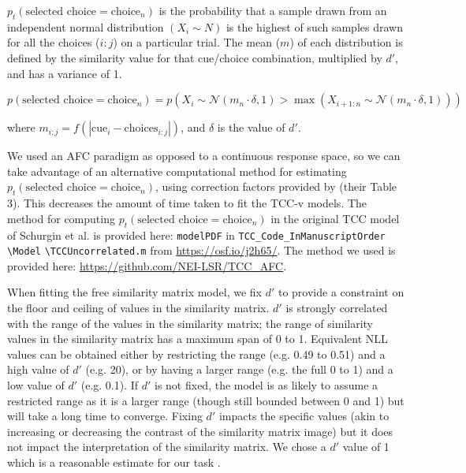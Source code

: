 \documentclass[9pt,biorxiv,lineno,onehalfspacing]{lapreprint}
\begin{document}
\begin{refsection}
$p_t(\text{selected choice} = \text{choice}_n)$ is the probability that a sample drawn from an independent normal distribution $(X_i \sim N)$ is the highest of such samples drawn for all the choices ($i:j$) on a particular trial. 
The mean ($m$) of each distribution is defined by the similarity value for that cue/choice combination, multiplied by $d'$, and has a variance of 1.

\begin{equation}
    p\left(\text{selected choice} = \text{choice}_n\right) = 
    p\left(X_i \sim \mathcal{N}\left(m_n \cdot \delta, 1\right)
    >\max 
    \left(X_{i+1: n} \sim \mathcal{N}\left(m_n \cdot \delta, 1\right)\right)\right)
\end{equation}

where $m_{i:j} = f\left(|\text{cue}_{i} - \text{choices}_{i:j}|\right)$, and $\delta$ is the value of $d'$.

We used an AFC paradigm as opposed to a continuous response space, so we can take advantage of an alternative computational method for estimating $p_t(\text{selected choice} = \text{choice}_n)$, using correction factors provided by \citet{mcgraw_common_1992} (their Table 3). 
This decreases the amount of time taken to fit the TCC-v models. 
The method for computing $p_t(\text{selected choice} = \text{choice}_n)$ in the original TCC model of Schurgin et al. is provided here: \verb|modelPDF| in \verb|TCC_Code_InManuscriptOrder |\verb|\Model| \verb|\TCCUncorrelated.m| from \url{https://osf.io/j2h65/}. 
The method we used is provided here: \url{https://github.com/NEI-LSR/TCC_AFC}.

When fitting the free similarity matrix model, we fix $d'$ to provide a constraint on the floor and ceiling of values in the similarity matrix.
$d'$ is strongly correlated with the range of the values in the similarity matrix; the range of similarity values in the similarity matrix has a maximum span of 0 to 1. 
Equivalent NLL values can be obtained either by restricting the range (e.g. 0.49 to 0.51) and a high value of $d'$ (e.g. 20), or by having a larger range (e.g. the full 0 to 1) and a low value of $d'$ (e.g. 0.1). 
If $d'$ is not fixed, the model is as likely to assume a restricted range as it is a larger range (though still bounded between 0 and 1) but will take a long time to converge. 
Fixing $d'$ impacts the specific values (akin to increasing or decreasing the contrast of the similarity matrix image) but it does not impact the interpretation of the similarity matrix. 
We chose a $d'$ value of 1 which is a reasonable estimate for our task \citep{schurgin_psychophysical_2020}.


\end{refsection}
\end{document}
